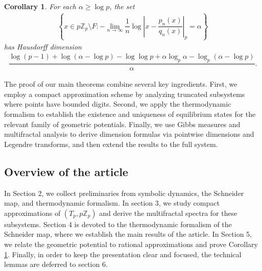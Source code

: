 \documentclass[11pt]{amsart}
\newtheorem{corollary}[theorem]{Corollary}
\theoremstyle{remark}
\numberwithin{equation}{section}
\newcommand{\Z}{\mathbb{Z}}
\newcommand{\Zp}{\mathbb{Z}_p}
\begin{document}
\begin{corollary}\label{ApproximationSpectrumTHM}
      For each $\alpha\geq \log p$, the set 
      \begin{align*}
        \left\{x\in p\Z_{p}\setminus F:-\lim_{n\rightarrow \infty}\dfrac{1}{n}\log \left|x-\dfrac{p_{n}(x)}{q_{n}(x)}\right|_{p}=\alpha\right\}  
      \end{align*}
     has Hausdorff dimension
      \begin{align*}
          \dfrac{\log(p-1)+\log(\alpha-\log p)-\log\log p+\alpha\log_{p}\alpha-\log_{p}(\alpha-\log p)}{\alpha}.
      \end{align*}
  \end{corollary}

The proof of our main theorems combine several key ingredients.
First, we employ a compact approximation scheme by analyzing truncated subsystems where points have bounded digits.
Second, we apply the thermodynamic formalism to establish the existence and uniqueness of equilibrium states for the relevant family of geometric potentials.
Finally, we use Gibbs measures and multifractal analysis to derive dimension formulas via pointwise dimensions and Legendre transforms, and then extend the results to the full system.


\subsection*{Overview of the article} In Section 2, we collect preliminaries from symbolic dynamics, the Schneider map, and thermodynamic formalism.
In section 3, we study compact approximations of $(T_{p},p\Zp)$ and derive the multifractal spectra for these subsystems. Section 4 is devoted to the thermodynamic formalism of the Schneider map, where we establish the main results of the article. In Section 5, we relate the geometric potential to rational approximations and prove Corollary \ref{ApproximationSpectrumTHM}. Finally, in order to keep the presentation clear and focused, the technical lemmas are deferred to section 6.



  
\end{document}
